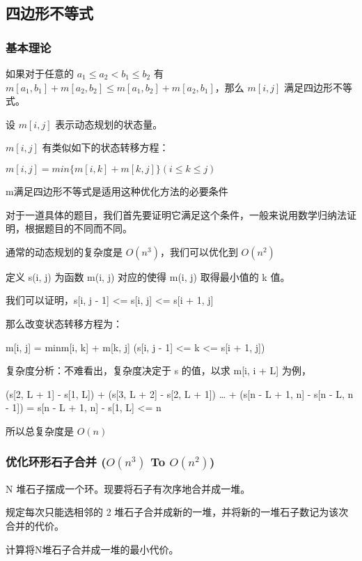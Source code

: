 \subsection{四边形不等式}

\subsubsection{基本理论}

如果对于任意的 $a_1 \le a_2 < b_1 \le b_2 $ 有 $m[a_1, b_1] + m[a_2, b_2] \le m[a_1, b_2] + m[a_2, b_1]$，那么 $m[i, j]$ 满足四边形不等式。

设 $m[i, j]$ 表示动态规划的状态量。

$m[i, j]$ 有类似如下的状态转移方程：

$m[i,j] = min\{m[i, k] + m[k, j]\} (i \le k \le j)$

m满足四边形不等式是适用这种优化方法的必要条件

对于一道具体的题目，我们首先要证明它满足这个条件，一般来说用数学归纳法证明，根据题目的不同而不同。

通常的动态规划的复杂度是 $O(n^3)$，我们可以优化到 $O(n^2)$

定义 s(i, j) 为函数 m(i, j) 对应的使得 m(i, j) 取得最小值的 k 值。

我们可以证明，s[i, j - 1] <= s[i, j] <= s[i + 1, j]

那么改变状态转移方程为：

m[i, j] = min{m[i, k] + m[k, j]} (s[i, j - 1] <= k <= s[i + 1, j])

复杂度分析：不难看出，复杂度决定于 s 的值，以求 m[i, i + L] 为例，

(s[2, L + 1] - s[1, L]) + (s[3, L + 2] - s[2, L + 1]) … + (s[n - L + 1, n] - s[n - L, n - 1]) = s[n - L + 1, n] - s[1, L] <= n

所以总复杂度是 $O(n)$

\subsubsection{优化环形石子合并  ($O(n^3)$ To $O(n^2)$)}

N 堆石子摆成一个环。现要将石子有次序地合并成一堆。

规定每次只能选相邻的 2 堆石子合并成新的一堆，并将新的一堆石子数记为该次合并的代价。

计算将N堆石子合并成一堆的最小代价。

